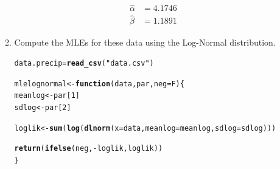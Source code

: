 \documentclass{article}\usepackage[]{graphicx}\usepackage[]{xcolor}
\makeatletter
\newcommand{\hlnum}[1]{\textcolor[rgb]{0.686,0.059,0.569}{#1}}%
\newcommand{\hlsng}[1]{\textcolor[rgb]{0.192,0.494,0.8}{#1}}%
\newcommand{\hlopt}[1]{\textcolor[rgb]{0,0,0}{#1}}%
\newcommand{\hldef}[1]{\textcolor[rgb]{0.345,0.345,0.345}{#1}}%
\newcommand{\hlkwa}[1]{\textcolor[rgb]{0.161,0.373,0.58}{\textbf{#1}}}%
\newcommand{\hlkwb}[1]{\textcolor[rgb]{0.69,0.353,0.396}{#1}}%
\newcommand{\hlkwc}[1]{\textcolor[rgb]{0.333,0.667,0.333}{#1}}%
\newcommand{\hlkwd}[1]{\textcolor[rgb]{0.737,0.353,0.396}{\textbf{#1}}}%
\newenvironment{kframe}{%
 \def\at@end@of@kframe{}%
 \ifinner\ifhmode%
  \def\at@end@of@kframe{\end{minipage}}%
  \begin{minipage}{\columnwidth}%
 \fi\fi%
 \def\FrameCommand##1{\hskip\@totalleftmargin \hskip-\fboxsep
 \colorbox{shadecolor}{##1}\hskip-\fboxsep
     \hskip-\linewidth \hskip-\@totalleftmargin \hskip\columnwidth}%
 \MakeFramed {\advance\hsize-\width
   \@totalleftmargin\z@ \linewidth\hsize
   \@setminipage}}%
 {\par\unskip\endMakeFramed%
 \at@end@of@kframe}
\newenvironment{knitrout}{}{} %
\makeatother
\begin{document}
\begin{enumerate}
\begin{enumerate}
    \begin{align*}
    \hat{\alpha}&=4.1746\\
    \hat{\beta}&=1.1891
\end{align*}
    \item Compute the MLEs for these data using the Log-Normal distribution.
\begin{knitrout}\scriptsize
{}\color{fgcolor}\begin{kframe}
\begin{alltt}
\hldef{data.precip} \hlkwb{=} \hlkwd{read_csv}\hldef{(}\hlsng{"data.csv"}\hldef{)}

\hldef{mlelognormal} \hlkwb{<-} \hlkwa{function}\hldef{(}\hlkwc{data}\hldef{,} \hlkwc{par}\hldef{,} \hlkwc{neg}\hldef{=F)\{}
  \hldef{meanlog} \hlkwb{<-} \hldef{par[}\hlnum{1}\hldef{]}
  \hldef{sdlog} \hlkwb{<-} \hldef{par[}\hlnum{2}\hldef{]}

  \hldef{loglik} \hlkwb{<-} \hlkwd{sum}\hldef{(}\hlkwd{log}\hldef{(}\hlkwd{dlnorm}\hldef{(}\hlkwc{x}\hldef{=data,} \hlkwc{meanlog}\hldef{=meanlog,} \hlkwc{sdlog}\hldef{=sdlog)))}

  \hlkwd{return}\hldef{(}\hlkwd{ifelse}\hldef{(neg,} \hlopt{-}\hldef{loglik, loglik))}
\hldef{\}}


\end{alltt}
\end{kframe}
\end{knitrout}
\end{enumerate}
\end{enumerate}
\end{document}

